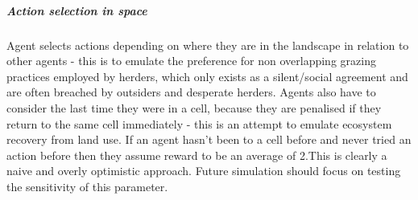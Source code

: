 \documentclass[
]{article}
\begin{document}
\hypertarget{action-selection-in-space}{%
\subparagraph{Action selection in
space}\label{action-selection-in-space}}

Agent selects actions depending on where they are in the landscape in
relation to other agents - this is to emulate the preference for non
overlapping grazing practices employed by herders, which only exists as
a silent/social agreement and are often breached by outsiders and
desperate herders. Agents also have to consider the last time they were
in a cell, because they are penalised if they return to the same cell
immediately - this is an attempt to emulate ecosystem recovery from land
use. If an agent hasn't been to a cell before and never tried an action
before then they assume reward to be an average of 2.This is clearly a
naive and overly optimistic approach. Future simulation should focus on
testing the sensitivity of this parameter.
\end{document}
